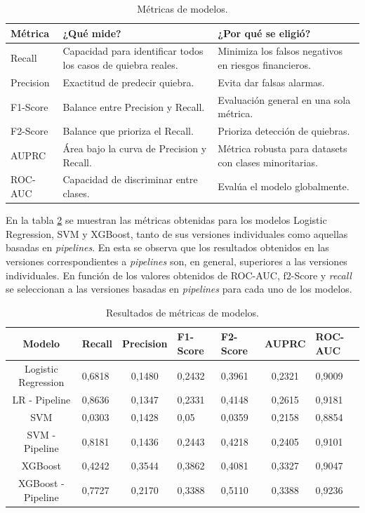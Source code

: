 \begin{table}[H]
    \centering
    \caption{Métricas de modelos.}
    \begin{tabularx}{\textwidth}{l X X}
        \toprule
        \textbf{Métrica} & \textbf{¿Qué mide?} & \textbf{¿Por qué se eligió?} \\
        \midrule
        Recall & Capacidad para identificar todos los casos de quiebra reales. & Minimiza los falsos negativos en riesgos financieros. \\
        Precision & Exactitud de predecir quiebra. & Evita dar falsas alarmas. \\
        F1-Score & Balance entre Precision y Recall. & Evaluación general en una sola métrica. \\
        F2-Score & Balance que prioriza el Recall. & Prioriza detección de quiebras. \\
        AUPRC & Área bajo la curva de Precision y Recall. & Métrica robusta para datasets con clases minoritarias. \\
        ROC-AUC & Capacidad de discriminar entre clases. & Evalúa el modelo globalmente. \\
        \bottomrule
		\hline
    \end{tabularx}
    \label{tab:metricas-de-modelos}
\end{table}

En la tabla \ref{tab:resultados-metricas} se muestran las métricas obtenidas para los modelos Logistic Regression, SVM y XGBoost, tanto de sus versiones individuales como aquellas basadas en \textit{pipelines}. En esta se observa que los resultados obtenidos en las versiones correspondientes a \textit{pipelines} son, en general, superiores a las versiones individuales. En función de los valores obtenidos de ROC-AUC, f2-Score y \textit{recall} se seleccionan a las versiones basadas en \textit{pipelines} para cada uno de los modelos.

\begin{table}[H]
    \centering
    \caption{Resultados de métricas de modelos.}
    \begin{tabularx}{\textwidth}{c X c X X c X}
		\toprule
		\textbf{Modelo} & \textbf{Recall} & \textbf{Precision} & \textbf{F1-Score} & \textbf{F2-Score} & \textbf{AUPRC} & \textbf{ROC-AUC}\\
		\midrule
        Logistic Regression & 0,6818 & 0,1480 & 0,2432 & 0,3961 & 0,2321 & 0,9009 \\
        LR - Pipeline & 0,8636 & 0,1347 & 0,2331 & 0,4148 & 0,2615 & 0,9181 \\
        SVM & 0,0303 & 0,1428 & 0,05 & 0,0359 & 0,2158 & 0,8854 \\
        SVM - Pipeline & 0,8181 & 0,1436 & 0,2443 & 0,4218 & 0,2405 & 0,9101 \\
        XGBoost & 0,4242 & 0,3544 & 0,3862 & 0,4081 & 0,3327 & 0,9047 \\
        XGBoost - Pipeline & 0,7727 & 0,2170 & 0,3388 & 0,5110 & 0,3388 & 0,9236 \\
        \bottomrule
		\hline
    \end{tabularx}
    \label{tab:resultados-metricas}
\end{table}

